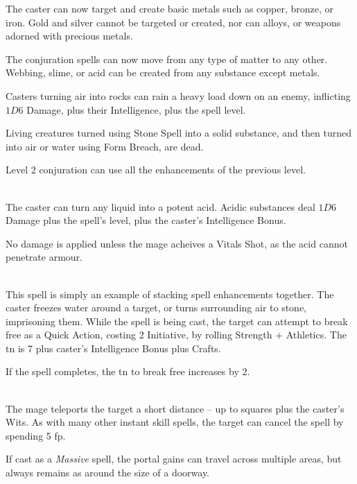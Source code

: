 \begin{multicols}{2}
The caster can now target and create basic metals such as copper, bronze, or iron.  Gold and silver cannot be targeted or created, nor can alloys, or weapons adorned with precious metals.

The conjuration spells can now move from any type of matter to any other.  Webbing, slime, or acid can be created from any substance except metals.

Casters turning air into rocks can rain a heavy load down on an enemy, inflicting $1D6$ Damage, plus their Intelligence, plus the spell level.

Living creatures turned using Stone Spell into a solid substance, and then turned into air or water using Form Breach, are dead.

\spelllevel

Level 2 conjuration can use all the enhancements of the previous level.

\\
The caster can turn any liquid into a potent acid.  Acidic substances deal $1D6$ Damage plus the spell's level, plus the caster's Intelligence Bonus.

No damage is applied unless the mage acheives a Vitals Shot, as the acid cannot penetrate armour.

\\
This spell is simply an example of stacking spell enhancements together.  The caster freezes water around a target, or turns surrounding air to stone, imprisoning them.
While the spell is being cast, the target can attempt to break free as a Quick Action, costing 2 Initiative, by rolling Strength + Athletics.
The \gls{tn} is 7 plus caster's Intelligence Bonus plus Crafts.

If the spell completes, the \gls{tn} to break free increases by 2.

\spelllevel

\\
The mage teleports the target a short distance -- up to  squares plus the caster's Wits.  As with many other instant skill spells, the target can cancel the spell by spending 5 \gls{fp}.

If cast as a \textit{Massive} spell, the portal gains can travel across multiple areas, but always remains as around the size of a doorway.


\end{multicols}
